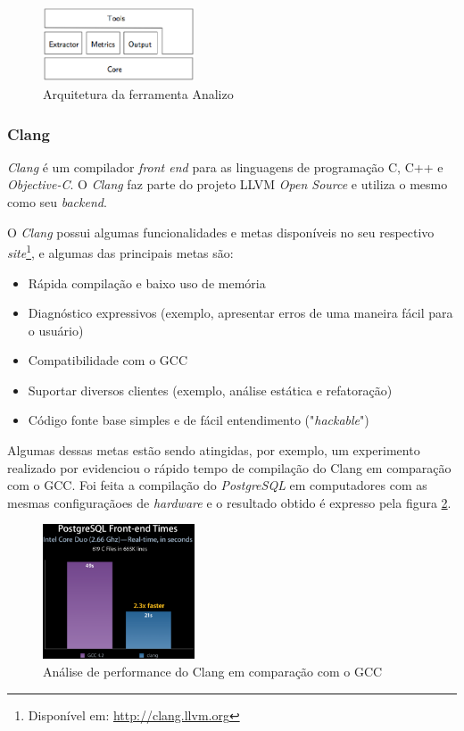 \begin{figure}[h]
  \centering
  \includegraphics[width=0.4\textwidth]
      {figuras/analizo.eps}
  \caption{Arquitetura da ferramenta Analizo}
  \label{archanalizo}
\end{figure}

\subsubsection{Clang} \label{clang}

\emph{Clang} é um compilador \textit{front end} para as linguagens de
programação C, C++ e \textit{Objective-C}. O \emph{Clang} faz parte
do projeto LLVM \textit{Open Source} e utiliza o mesmo como seu \textit{backend}. 

O \emph{Clang} possui algumas funcionalidades e metas disponíveis no seu respectivo
\textit{site}\footnote{Disponível em: \url{http://clang.llvm.org}}, e
algumas das principais metas são:

\begin{itemize}
  \item Rápida compilação e baixo uso de memória
  \item Diagnóstico expressivos (exemplo, apresentar erros de uma maneira fácil para o usuário)
  \item Compatibilidade com o GCC
  \item Suportar diversos clientes (exemplo, análise estática e refatoração)
  \item Código fonte base simples e de fácil entendimento ("\textit{hackable}")
\end{itemize}

Algumas dessas metas estão sendo atingidas, por exemplo, um experimento realizado por \cite{naroff2009} evidenciou o rápido
tempo de compilação do Clang em comparação com o GCC. Foi feita a compilação do \textit{PostgreSQL} em computadores com as
mesmas configuraçãoes de \textit{hardware} e o resultado obtido é expresso pela figura \ref{clang_gcc}.

\begin{figure}[h]
  \centering
  \includegraphics[width=0.4\textwidth]
      {figuras/clang_gcc.eps}
  \caption{Análise de performance do Clang em comparação com o GCC}
  \label{clang_gcc}
\end{figure}

